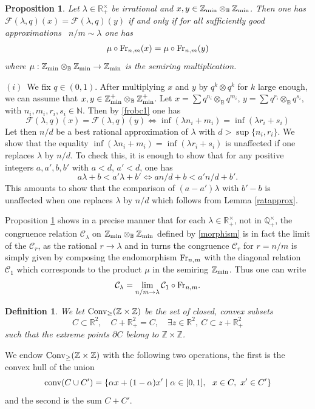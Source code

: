 \documentclass[noams,lp]{compositio}
\newtheorem{defn}[thm]{Definition} %
\newtheorem{prop}[thm]{Proposition}
\def\B{{\mathbb B}}
\def\N{{\mathbb N}}
\def\Q{{\mathbb Q}}
\def\R{{\mathbb R}}
\def\Z{{\mathbb Z}}
\def\cC{{\mathcal C}}
\def\cF{{\mathcal F}}
\def\conv{{\rm Conv}_\geq}
\def\zmin{\Z_{\rm min}}
\def\fr{{\rm Fr}}
\def\nbo{{\zmin\otimes_\B \zmin}}
\def\nboplus{{\zmin^+\otimes_\B \zmin^+}}
\begin{document}
\begin{prop}\label{approxprop}
Let $\lambda\in \R_+^\times$ be irrational and $x,y\in \zmin\otimes_\B \zmin$. Then one has $\cF(\lambda,q)(x)=
\cF(\lambda,q)(y)$ if and only if for all sufficiently good approximations~ $n/m\sim \lambda$ one has 
$$
\mu\circ \fr_{n,m}(x)=\mu\circ \fr_{n,m}(y)
$$
where $\mu:\zmin\otimes_\B \zmin\to \zmin$ is the semiring multiplication. 
\end{prop}
\proof $(i)$~We fix $q\in (0,1)$. After multiplying $x$ and $y$ by $q^k\otimes  q^k$ for $k$ large enough, we can assume that $x,y\in \nboplus$. Let $x=\sum q^{n_i}\otimes_\B q^{m_i}$, $y=\sum q^{r_i}\otimes_\B q^{s_i}$, with $n_i,m_i,r_i,s_i\in \N$. Then by \eqref{frobc1} one has $$
\cF(\lambda,q)(x)=
\cF(\lambda,q)(y) \iff \inf (\lambda n_i+m_i)=\inf (\lambda r_i+s_i)
$$
Let then $n/d$ be a best rational approximation of $\lambda$ with $d>\sup\{n_i,r_i  \}$. We show that the equality 
$\inf (\lambda n_i+m_i)=\inf (\lambda r_i+s_i)$ is unaffected if one replaces $\lambda$ by $n/d$. To check this, it is enough to show that for any positive integers $a,a',b,b'$ with $a<d$, $a'<d$, one has 
$$
a\lambda +b<a'\lambda +b'\iff an/d +b<a' n/d +b'.
$$
This amounts to show that the comparison of $(a-a')\lambda$ with $b'-b$ is unaffected when one replaces $\lambda$ by $n/d$ which follows from Lemma \ref{ratapprox}.\endproof

Proposition \ref{approxprop} shows in a precise manner that for each $\lambda\in \R_+^\times$, not in $\Q_+^\times$, the congruence relation $\cC_\lambda$  on $\nbo$ defined by 
\eqref{morphism} 
is in fact the limit of the $\cC_r$, as the rational $r\to \lambda$ and in turns the congruence $\cC_r$ for $r=n/m$ is simply given by composing the endomorphism $\fr_{n,m}$ with the diagonal relation $\cC_1$ which corresponds to the product $\mu$ in the semiring $\zmin$. Thus one can write 
\begin{equation}\label{congruence1}
  \cC_\lambda= \lim_{n/m\to \lambda}\cC_1\circ \fr_{n,m}.
\end{equation}


\begin{defn} We let $\conv(\Z\times \Z)$ be the set of closed, convex subsets 
$$
C\subset \R^2, \quad C+\R_+^2=C, \quad \exists z\in \R^2, ~C\subset z+\R_+^2
$$ such that the extreme points $\partial C$ belong to $\Z\times \Z$.
\end{defn}

We endow $\conv(\Z\times \Z)$ with the following two operations, the first is the convex hull of the union
\begin{equation}\label{consum}
{\rm conv}(C\cup C')=\{\alpha x+(1-\alpha)x'\mid \alpha \in [0,1],\  \  x\in C, \  x'\in C'\}
\end{equation}
and the second is the sum $C+C'$.
\end{document}
